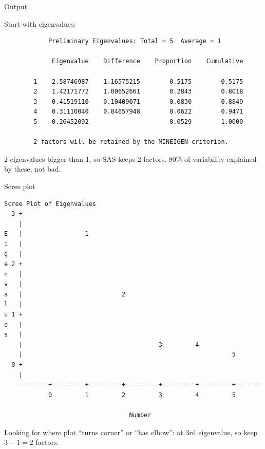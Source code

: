 \documentclass[pdf]{prosper}
\begin{document}
\begin{slide}{Output}

Start with eigenvalues:

{\scriptsize
\begin{verbatim}
            Preliminary Eigenvalues: Total = 5  Average = 1
 
             Eigenvalue    Difference    Proportion    Cumulative

        1    2.58746987    1.16575215        0.5175        0.5175
        2    1.42171772    1.00652661        0.2843        0.8018
        3    0.41519110    0.10409071        0.0830        0.8849
        4    0.31110040    0.04657948        0.0622        0.9471
        5    0.26452092                      0.0529        1.0000

        2 factors will be retained by the MINEIGEN criterion.
\end{verbatim}
}

2 eigenvalues bigger than 1, so SAS keeps 2 factors. 80\% of variability explained by these, not bad.

  
\end{slide}

\begin{slide}{Scree plot}
  
{\tiny
\begin{verbatim}
Scree Plot of Eigenvalues
  3 +
    |
E   |                 1
i   |
g   |
e 2 +
n   |
v   |
a   |                           2
l   |
u 1 +
e   |
s   |
    |                                     3         4
    |                                                         5
  0 +
    |
    --------+---------+---------+---------+---------+---------+-------
            0         1         2         3         4         5

                                  Number
\end{verbatim}
}

Looking for where plot ``turns corner'' or ``has elbow'': at 3rd eigenvalue, so keep $3-1=2$ factors.

\end{slide}
\end{document}

